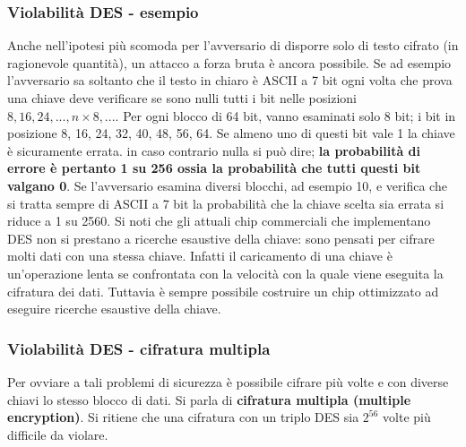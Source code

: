 \subsubsection{Violabilità DES - esempio}
Anche nell'ipotesi più scomoda per l'avversario di disporre solo di testo cifrato (in ragionevole quantità), un attacco a forza bruta è ancora possibile. Se ad esempio l'avversario sa soltanto che il testo in chiaro è ASCII a 7 bit ogni volta che prova una chiave deve verificare se sono nulli tutti i bit nelle posizioni $8, 16, 24, ..., n \times 8, ...$. Per ogni blocco di 64 bit, vanno esaminati solo 8 bit; i bit in posizione 8, 16, 24, 32, 40, 48, 56, 64. Se almeno uno di questi bit vale 1 la chiave è sicuramente errata. in caso contrario nulla si può dire; \textbf{la probabilità di errore è pertanto 1 su 256 ossia la probabilità che tutti questi bit valgano 0}. Se l'avversario esamina diversi blocchi, ad esempio 10, e verifica che si tratta sempre di ASCII a 7 bit la probabilità che la chiave scelta sia errata si riduce a 1 su 2560. Si noti che gli attuali chip commerciali che implementano DES non si prestano a ricerche esaustive della chiave: sono pensati per cifrare molti dati con una stessa chiave. Infatti il caricamento di una chiave è un'operazione lenta se confrontata con la velocità con la quale viene eseguita la cifratura dei dati. Tuttavia è sempre possibile costruire un chip ottimizzato ad eseguire ricerche esaustive della chiave.

\subsubsection{Violabilità DES - cifratura multipla}
Per ovviare a tali problemi di sicurezza è possibile cifrare più volte e con diverse chiavi lo stesso blocco di dati. Si parla di \textbf{cifratura multipla (multiple encryption)}. Si ritiene che una cifratura con un triplo DES sia
$2^{56}$ volte più difficile da violare.

